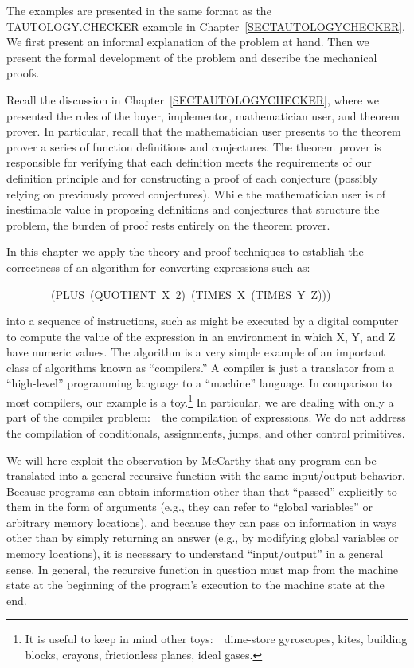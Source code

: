 \documentclass[11pt]{book}
\newenvironment{pubasis}{\begin{flushleft}\ttfamily\small}{\normalsize\rmfamily\end{flushleft}}
\begin{document}
The examples are presented in the same format as the TAU\-TOL\-OGY.CHECK\-ER
example in Chapter~\ref{SECTAUTOLOGYCHECKER}.  We first present an informal explanation
of the problem at hand.  Then we present the formal development of the
problem and describe the mechanical proofs.

Recall the discussion in Chapter~\ref{SECTAUTOLOGYCHECKER}, where we presented
the roles of the buyer, implementor, mathematician user, and
theorem prover.  In particular, recall that the mathematician user
presents to the theorem prover a series of function definitions
and conjectures.  The theorem prover is responsible
for verifying that each definition meets the requirements
of our definition principle and for constructing
a proof of each conjecture (possibly relying on previously
proved conjectures).  While the mathematician user is of inestimable
value in proposing definitions and conjectures that structure
the problem, the burden of proof rests entirely on the theorem
prover.

In this chapter we apply the theory and proof
techniques to establish the correctness of an algorithm for
converting expressions such as:
\begin{pubasis}
~~~~~~~~(PLUS~(QUOTIENT~X~2)~(TIMES~X~(TIMES~Y~Z)))\\
\end{pubasis}
into a sequence of instructions, such as might be executed by a
digital computer to compute the value of the expression in an
environment in which X, Y, and Z have numeric values.
The algorithm is a very simple
example of an important class of algorithms known as ``compilers.''
A compiler is just a translator from a ``high-level'' programming
language to a ``machine'' language.
In comparison to most compilers, our example is a toy.\footnote{It is useful to keep in mind other toys:~~dime-store gyroscopes, kites, building blocks, crayons, frictionless planes, ideal gases.}
In particular, we are dealing with only a part of the compiler
problem:~~the compilation of expressions.  We do not address the
compilation of conditionals, assignments, jumps, and other
control primitives.

We will here exploit the observation by McCarthy \cite{MCCARTHYSYMB}
that any program can be translated into a general recursive function with the
same input/output behavior.  Because programs can obtain information
other than that ``passed'' explicitly to them in the form of arguments
(e.g., they can refer to ``global variables'' or arbitrary memory
locations), and because they can pass on information in ways other
than by simply returning an answer (e.g., by modifying
global variables or memory locations), it is necessary to understand
``input/output'' in a general sense.
In general, the recursive function in question must map from
the machine state at the beginning of the program's execution to the machine state
at the end.
\end{document}
